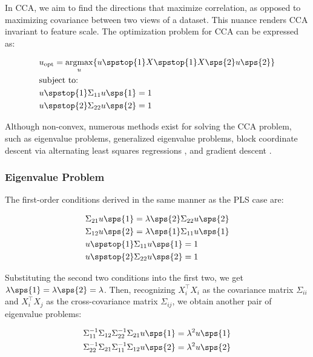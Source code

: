 In CCA, we aim to find the directions that maximize correlation, as opposed to maximizing covariance between two views of a dataset.
This nuance renders CCA invariant to feature scale. The optimization problem for CCA can be expressed as:

\begin{align}
     & u_{\text{opt}}=\underset{u}{\mathrm{argmax}}\{ u\spstop{1}X\spstop{1}X\sps{2}u\sps{2} \} \\
     & \text{subject to:} \notag \\
     & u\spstop{1}\Sigma_{11}u\sps{1}=1 \notag \\
     & u\spstop{2}\Sigma_{22}u\sps{2}=1 \notag
\end{align}

Although non-convex, numerous methods exist for solving the CCA problem, such as eigenvalue problems, generalized eigenvalue problems, block coordinate descent via alternating least squares regressions \citep{golub1995canonical,sun2008least} , and gradient descent \citep{via2007learning}.

\subsubsection{Eigenvalue Problem}

The first-order conditions derived in the same manner as the PLS case are:

\begin{align}\label{CCA:FOCs}
     & \Sigma_{21}u\sps{1}=\lambda\sps{2} \Sigma_{22}u\sps{2} \\
     & \Sigma_{12}u\sps{2}=\lambda\sps{1} \Sigma_{11}u\sps{1} \\
     & u\spstop{1}\Sigma_{11}u\sps{1}=1 \\
     & u\spstop{2}\Sigma_{22}u\sps{2}=1
\end{align}

Substituting the second two conditions into the first two, we get \(\lambda\sps{1}=\lambda\sps{2}=\lambda\). Then, recognizing \(X_i^{\top}X_i\) as the covariance matrix \(\Sigma_{ii}\) and \(X_i^{\top}X_j\) as the cross-covariance matrix \(\Sigma_{ij}\), we obtain another pair of eigenvalue problems:

\begin{align}
     & \Sigma_{11}^{-1}\Sigma_{12}\Sigma_{22}^{-1}\Sigma_{21}u\sps{1}=\lambda^2u\sps{1} \notag \\
     & \Sigma_{22}^{-1}\Sigma_{21}\Sigma_{11}^{-1}\Sigma_{12}u\sps{2}=\lambda^2u\sps{2} \notag
\end{align}

